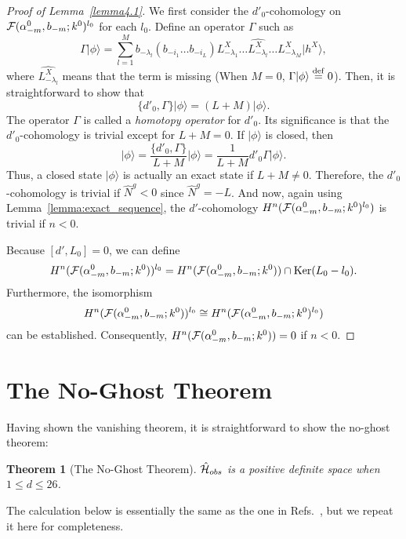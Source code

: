 \documentclass[a4paper,12pt]{article}
\newcommand{\ket}[1]{\mbox{$| #1 \rangle$}}
\newcommand{\defi}{\stackrel{\rm def}{=}}
\newcommand{\hN}{\hat{N}^g}
\newtheorem{theorem}{Theorem}[section]
\begin{document}
\begin{proof}[Proof of Lemma~\ref{lemma4.1}]
We first consider the $d'_{0}$-cohomology on
${\cal F}(\alpha^{0}_{-m}, b_{-m};k^0)^{l_0}$ for each $l_0$.
Define an operator $\Gamma$ such as
\begin{equation}
%
\Gamma \ket{\phi} =
\sum_{l=1}^{M} b_{-\lambda_{l}} \left( b_{-i_{1}} \ldots b_{-i_{L}} \right)
L^{X}_{-\lambda_{1}} \ldots \widehat{{L}^{X}_{-\lambda_{l}}} \ldots
L^{X}_{-\lambda_{M}} \ket{h^{X}},
%
\end{equation}
where $\widehat{{L}^{X}_{-\lambda_{l}}}$ means that the term is missing
(When $M=0$, $\Gamma \ket{\phi} \defi 0$). Then,
it is straightforward to show that
\begin{equation}
%
\{ d'_{0}, \Gamma \} \ket{\phi} = (L+M) \ket{\phi}.
%
\end{equation}
The operator $\Gamma$ is called a {\it homotopy operator} for $d'_{0}$. Its
significance is that the $d'_{0}$-cohomology is trivial except for $L+M =
0$. If $\ket{\phi}$ is closed, then
\begin{equation}
%
\ket{\phi}      = \frac{\{ d'_{0}, \Gamma \}}{L+M} \ket{\phi}
                = \frac{1}{L+M} d'_{0} \Gamma \ket{\phi}.
%
\end{equation}
Thus, a closed state $\ket{\phi}$ is actually an exact state if $L+M\neq 0$.
Therefore, the $d'_{0}$-cohomology is trivial if $\hN<0$ since $\hN=-L$.
And now, again using Lemma~\ref{lemma:exact_sequence},
the $d'$-cohomology $H^n({\cal F}(\alpha^{0}_{-m}, b_{-m};k^0)^{l_0})$
is trivial if $n<0$.

Because $[d',L_0]=0$, we can define
\begin{equation}
%
H^n({\cal F}(\alpha^{0}_{-m}, b_{-m};k^0))^{l_0} =
H^n({\cal F}(\alpha^{0}_{-m}, b_{-m};k^0))\cap \mbox{Ker}(L_0-l_0).
%
\end{equation}
Furthermore, the isomorphism
\begin{equation}
%
H^n({\cal F}(\alpha^{0}_{-m}, b_{-m};k^0))^{l_0} \cong
H^n({\cal F}(\alpha^{0}_{-m}, b_{-m};k^0)^{l_0})
%
\end{equation}
can be established. Consequently, 
$H^n({\cal F}(\alpha^{0}_{-m}, b_{-m};k^0))=0$
if $n <0$.
\end{proof}

\section{The No-Ghost Theorem}\label{sec:no-ghost}

Having shown the vanishing theorem, it is straightforward to show
the no-ghost theorem:
\begin{theorem}[The No-Ghost Theorem]
%
$\hat{\cal H}_{obs}$ is a positive definite space when $1 \leq d \leq 26$.
%
\end{theorem}
\noindent The calculation below is essentially the same as the one in
Refs.~\cite{FGZ,spiegelglas,FK}, but we repeat it here for completeness.
\end{document}
